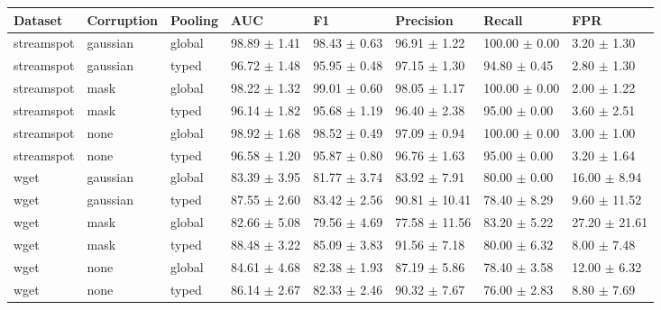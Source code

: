 \begin{tabular}{llllllll}
\toprule
Dataset & Corruption & Pooling & AUC & F1 & Precision & Recall & FPR \\
\midrule
streamspot & gaussian & global & 98.89 $\pm$ 1.41 & 98.43 $\pm$ 0.63 & 96.91 $\pm$ 1.22 & 100.00 $\pm$ 0.00 & 3.20 $\pm$ 1.30 \\
streamspot & gaussian & typed & 96.72 $\pm$ 1.48 & 95.95 $\pm$ 0.48 & 97.15 $\pm$ 1.30 & 94.80 $\pm$ 0.45 & 2.80 $\pm$ 1.30 \\
streamspot & mask & global & 98.22 $\pm$ 1.32 & 99.01 $\pm$ 0.60 & 98.05 $\pm$ 1.17 & 100.00 $\pm$ 0.00 & 2.00 $\pm$ 1.22 \\
streamspot & mask & typed & 96.14 $\pm$ 1.82 & 95.68 $\pm$ 1.19 & 96.40 $\pm$ 2.38 & 95.00 $\pm$ 0.00 & 3.60 $\pm$ 2.51 \\
streamspot & none & global & 98.92 $\pm$ 1.68 & 98.52 $\pm$ 0.49 & 97.09 $\pm$ 0.94 & 100.00 $\pm$ 0.00 & 3.00 $\pm$ 1.00 \\
streamspot & none & typed & 96.58 $\pm$ 1.20 & 95.87 $\pm$ 0.80 & 96.76 $\pm$ 1.63 & 95.00 $\pm$ 0.00 & 3.20 $\pm$ 1.64 \\
wget & gaussian & global & 83.39 $\pm$ 3.95 & 81.77 $\pm$ 3.74 & 83.92 $\pm$ 7.91 & 80.00 $\pm$ 0.00 & 16.00 $\pm$ 8.94 \\
wget & gaussian & typed & 87.55 $\pm$ 2.60 & 83.42 $\pm$ 2.56 & 90.81 $\pm$ 10.41 & 78.40 $\pm$ 8.29 & 9.60 $\pm$ 11.52 \\
wget & mask & global & 82.66 $\pm$ 5.08 & 79.56 $\pm$ 4.69 & 77.58 $\pm$ 11.56 & 83.20 $\pm$ 5.22 & 27.20 $\pm$ 21.61 \\
wget & mask & typed & 88.48 $\pm$ 3.22 & 85.09 $\pm$ 3.83 & 91.56 $\pm$ 7.18 & 80.00 $\pm$ 6.32 & 8.00 $\pm$ 7.48 \\
wget & none & global & 84.61 $\pm$ 4.68 & 82.38 $\pm$ 1.93 & 87.19 $\pm$ 5.86 & 78.40 $\pm$ 3.58 & 12.00 $\pm$ 6.32 \\
wget & none & typed & 86.14 $\pm$ 2.67 & 82.33 $\pm$ 2.46 & 90.32 $\pm$ 7.67 & 76.00 $\pm$ 2.83 & 8.80 $\pm$ 7.69 \\
\bottomrule
\end{tabular}
